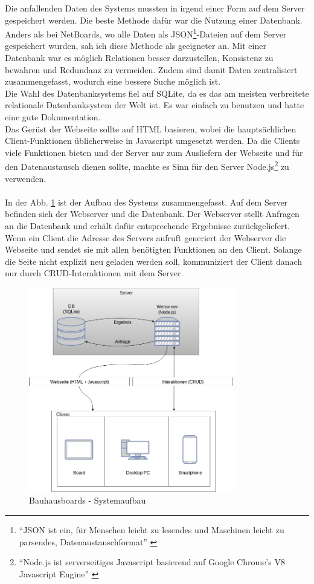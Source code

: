 Die anfallenden Daten des Systems mussten in irgend einer Form auf dem Server gespeichert werden. Die beste Methode dafür war die Nutzung einer Datenbank. Anders als bei NetBoards, wo alle Daten als JSON\footnote{``JSON ist ein, für Menschen leicht zu lesendes und Maschinen leicht zu parsendes, Datenaustauschformat'' \cite{json:website}}-Dateien auf dem Server gespeichert wurden, sah ich diese Methode als geeigneter an. Mit einer Datenbank war es möglich Relationen besser darzustellen, Konsistenz zu bewahren und Redundanz zu vermeiden. Zudem sind damit Daten zentralisiert zusammengefasst, wodurch eine bessere Suche möglich ist.
\\
Die Wahl des Datenbanksystems fiel auf SQLite, da es das am meisten verbreitete relationale Datenbanksystem der Welt ist. Es war einfach zu benutzen und hatte eine gute Dokumentation.
\\
Das Gerüst der Webseite sollte auf HTML basieren, wobei die hauptsächlichen Client-Funktionen üblicherweise in Javascript umgesetzt werden. Da die Clients viele Funktionen bieten und der Server nur zum Ausliefern der Webseite und für den Datenaustausch dienen sollte, machte es Sinn für den Server Node.js\footnote{``Node.js ist serverseitiges Javascript basierend auf Google Chrome's V8 Javascript Engine'' \cite{nodejs:website}} zu verwenden.
\\
\\
In der Abb. \ref{img:Systemaufbau} ist der Aufbau des Systems zusammengefasst. Auf dem Server befinden sich der Webserver und die Datenbank. Der Webserver stellt Anfragen an die Datenbank und erhält dafür entsprechende Ergebnisse zurückgeliefert.
\\
Wenn ein Client die Adresse des Servers aufruft generiert der Webserver die Webseite und sendet sie mit allen benötigten Funktionen an den Client. Solange die Seite nicht explizit neu geladen werden soll, kommuniziert der Client danach nur durch CRUD-Interaktionen mit dem Server.
\\
\begin{figure}[h!]
  \centering
    \includegraphics[width=0.8\textwidth]{./img/Systemaufbau.png}
  \caption{Bauhausboards - Systemaufbau}
  \label{img:Systemaufbau}
\end{figure}
